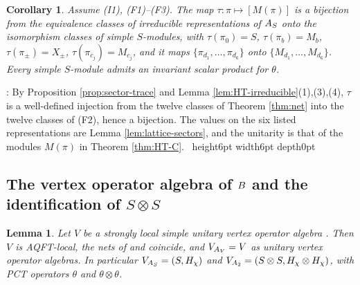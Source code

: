 \documentclass[leqno]{article}
\let\cal\relax
\newcommand{\cal}{\mathcal}
\newcommand{\qed}{\hfill \vrule height6pt  width6pt depth0pt}
\newcommand{\co}{\colon}
\newcommand{\ot}{\otimes}
\newtheorem{cor}[thm]{Corollary}
\newtheorem{lemma}[thm]{Lemma}
\newenvironment{proof}[1][]{\noindent {\it Proof #1} : }{\hbox{~}\qed
\smallskip
}
\numberwithin{equation}{section}
\begin{document}
\begin{cor}
\label{cor:tau-bijection}
Assume \textup{(I1)}, \textup{(F1)}--\textup{(F3)}. The map $\tau \co \pi \mapsto [M(\pi)]$ is a bijection from the equivalence classes of irreducible representations of $\cal A_S$ onto the isomorphism classes of simple $S$-modules, with $\tau(\pi_0) = S$, $\tau(\pi_b) = M_b$, $\tau(\pi_\pm) = X_\pm$, $\tau(\pi_{c_j}) = M_{c_j}$, and it maps $\{\pi_{d_1},\ldots,\pi_{d_6}\}$ onto $\{M_{d_1},\ldots,M_{d_6}\}$. Every simple $S$-module admits an invariant scalar product for $\theta$.
\end{cor}

\begin{proof}
By Proposition \ref{prop:sector-trace} and Lemma \ref{lem:HT-irreducible}(1),(3),(4), $\tau$ is a well-defined injection from the twelve classes of Theorem \ref{thm:net} into the twelve classes of (F2), hence a bijection. The values on the six listed representations are Lemma \ref{lem:lattice-sectors}, and the unitarity is that of the modules $M(\pi)$ in Theorem \ref{thm:HT-C}.
\end{proof}


\subsection{The vertex operator algebra of \texorpdfstring{$\cal B$}{B} and the identification of \texorpdfstring{$S \ot S$}{S x S}}
\label{subsec:identification-SS}

\begin{lemma}
\label{lem:AQFT-local}
Let $V$ be a strongly local simple unitary vertex operator algebra \cite[Definition 6.7 p.~53]{CKLW18}. Then $V$ is AQFT-local, the nets of \cite{CKLW18} and \cite{HeT25} coincide, and $V_{\cal A_V} = V$ as unitary vertex operator algebras. In particular $V_{\cal A_S} = (S,H_\chi)$ and $V_{\cal A_2} = (S \ot S, H_\chi \ot H_\chi)$, with PCT operators $\theta$ and $\theta \ot \theta$.
\end{lemma}
\end{document}
